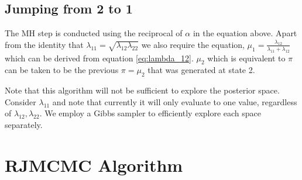 \documentclass{article}
\begin{document}
\subsection{Jumping from 2 to 1}
The MH step is conducted using the reciprocal of $\alpha$ in the equation above. Apart from the identity that $\lambda_{11}=\sqrt{\lambda_{12}\lambda_{22}}$ we also require the equation, $\mu_1=\frac{\lambda_{12}}{\lambda_{11}+\lambda_{12}}$ which can be derived from equation \ref{eq:lambda_12}. $\mu_2$ which is equivalent to $\pi$ can be taken to be the previous $\pi=\mu_2$ that was generated at state 2.

Note that this algorithm will not be sufficient to explore the posterior space. Consider $\lambda_{11}$ and note that currently it will only evaluate to one value, regardless of $\lambda_{12}, \lambda_{22}$. We employ a Gibbs sampler to efficiently explore each space separately.

 \section{RJMCMC Algorithm}
\end{document}
